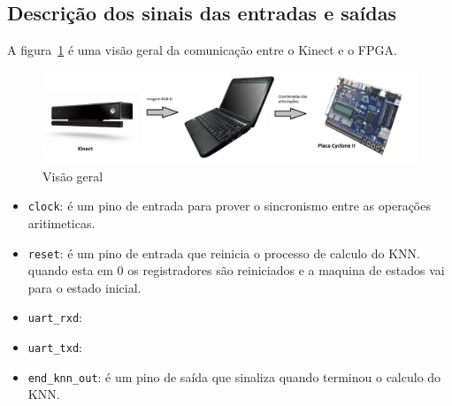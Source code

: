 \subsection{Descrição dos sinais das entradas e saídas}

A figura~\ref{fig:visaogeral} é uma visão geral da comunicação entre o Kinect e
o FPGA.

\begin{figure}[h]
\centering
\includegraphics[width=.5\textwidth]{img/visao_geral}
\caption{Visão geral}
\label{fig:visaogeral}
\end{figure}


\begin{itemize}

\item \verb|clock|: é um pino de entrada para prover o sincronismo entre as
operações aritimeticas.

\item \verb|reset|: é um pino de entrada que reinicia o processo de calculo do
KNN. quando esta em 0 os registradores são reiniciados e a maquina de estados
vai para o estado inicial.

\item \verb|uart_rxd|:

\item \verb|uart_txd|:

\item \verb|end_knn_out|: é um pino de saída que sinaliza quando 
terminou o calculo do KNN.

\end{itemize}